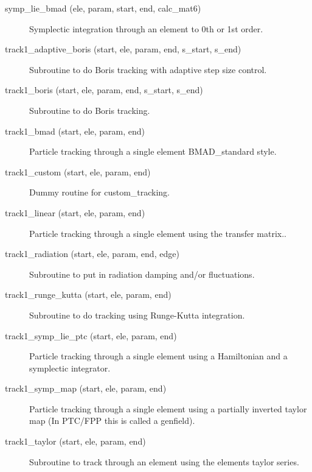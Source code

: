 \begin{description}

\label{r:symp.lie.bmad}
\item[symp_lie_bmad (ele, param, start, end, calc_mat6)] \Newline
Symplectic integration through an element to 0th or 1st order.

\label{r:track1.adaptive.boris}
\item[track1_adaptive_boris (start, ele, param, end, s_start, s_end)] \Newline
Subroutine to do Boris tracking with adaptive step size control. 

\label{r:track1.boris}
\item[track1_boris (start, ele, param, end, s_start, s_end)] \Newline
Subroutine to do Boris tracking.  

\label{r:track1.bmad}
\item[track1_bmad (start, ele, param, end)] \Newline
Particle tracking through a single element BMAD_standard style. 

\label{r:track1.custom}
\item[track1_custom (start, ele, param, end)] \Newline
Dummy routine for custom_tracking.

\label{r:track1.linear}
\item[track1_linear (start, ele, param, end)] \Newline
Particle tracking through a single element using the transfer matrix.. 

\label{r:track1.radiation}
\item[track1_radiation (start, ele, param, end, edge)] \Newline
Subroutine to put in radiation damping and/or fluctuations. 

\label{r:track1.runge.kutta}
\item[track1_runge_kutta (start, ele, param, end)] \Newline
Subroutine to do tracking using Runge-Kutta integration. 

\label{r:track1.symp.lie.ptc}
\item[track1_symp_lie_ptc (start, ele, param, end)] \Newline
Particle tracking through a single element using a Hamiltonian and a 
symplectic integrator. 

\label{r:track1.symp.map}
\item[track1_symp_map (start, ele, param, end)] \Newline
Particle tracking through a single element using a partially inverted 
taylor map (In PTC/FPP this is called a genfield). 

\label{r:track1.taylor}
\item[track1_taylor (start, ele, param, end)] \Newline
Subroutine to track through an element using the elements taylor series. 

\end{description}

